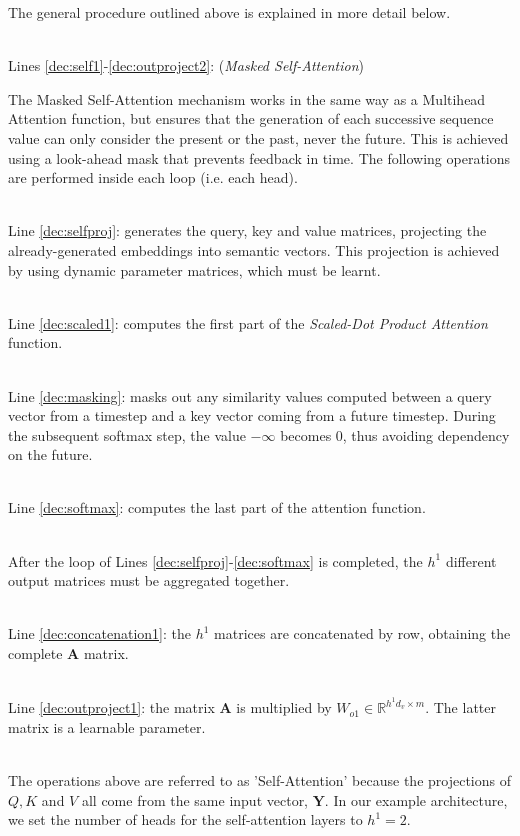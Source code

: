 \documentclass[algorithms,article,submit,pdftex,moreauthors]{Definitions/mdpi}
\begin{document}
The general procedure outlined above is explained in more detail below.

~\\Lines \ref{dec:self1}-\ref{dec:outproject2}: (\textit{Masked Self-Attention})

The Masked Self-Attention mechanism works in the same way as a Multihead Attention function, but ensures that the generation of each successive sequence value can only consider the present or the past, never the future. This is achieved using a look-ahead mask that prevents feedback in time.
The following operations are performed inside each loop (i.e. each head).

~\\Line \ref{dec:selfproj}: generates the query, key and value matrices, projecting the already-generated embeddings into semantic vectors. This projection is achieved by using dynamic parameter matrices, which must be learnt.

~\\Line \ref{dec:scaled1}: computes the first part of the \textit{Scaled-Dot Product Attention} function.

~\\Line \ref{dec:masking}: masks out any similarity values computed between a query vector from a timestep and a key vector coming from a future timestep. During the subsequent softmax step, the value $-\infty$ becomes 0, thus avoiding dependency on the future.

~\\Line \ref{dec:softmax}: computes the last part of the attention function.

~\\After the loop of Lines \ref{dec:selfproj}-\ref{dec:softmax} is completed, the $h^1$ different output matrices must be aggregated together.

~\\Line \ref{dec:concatenation1}: the $h^1$ matrices are concatenated by row, obtaining the complete \textbf{A} matrix.

~\\Line \ref{dec:outproject1}: the matrix \textbf{A} is multiplied by $W_{o1} \in \mathbb{R}^{h^1d_v \times m}$. The latter matrix is a learnable parameter.

~\\The operations above are referred to as 'Self-Attention' because the projections of $Q, K$ and $V$ all come from the same input vector, $\textbf{Y}$. In our example architecture, we set the number of heads for the self-attention layers to $h^1 = 2$.
\end{document}
